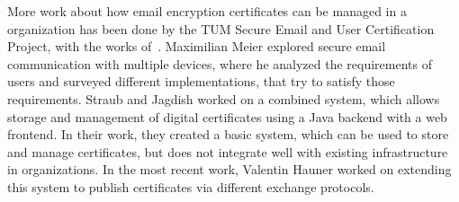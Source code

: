 More work about how email encryption certificates can be managed in a organization has been done by the TUM Secure
Email and User Certification Project, with the works
of~\citet{hauner2016interoperability, jagdish2016certservice, straub2016directoryservice, maier2015multidevice}.
Maximilian Meier explored secure email communication with multiple devices, where he analyzed the requirements of
users and surveyed different implementations, that try to satisfy those requirements.
Straub and Jagdish worked on a combined system, which allows storage and management of digital certificates using a Java
backend with a web frontend.
In their work, they created a basic system, which can be used to store and manage certificates, but does not integrate
well with existing infrastructure in organizations.
In the most recent work, Valentin Hauner worked on extending this system to publish certificates via different exchange
protocols.
